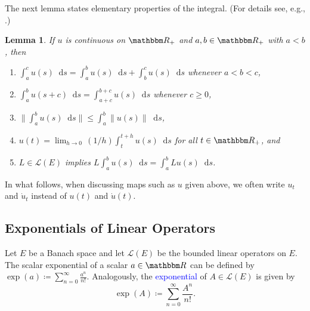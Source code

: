 \documentclass[12pt, reqno]{amsart}
\renewcommand{\leq}{\leqslant}
\renewcommand{\geq}{\geqslant}
\newcommand{\1}{\mathbbm 1}
\newcommand*\diff{\mathop{}\!\mathrm{d}}
\newcommand{\lL}{\mathcal L}
\newcommand{\RR}{\mathbbm R}
\theoremstyle{plain}
\newtheorem{lemma}[theorem]{Lemma}
\theoremstyle{definition}
\newcommand{\navy}[1]{\textcolor{blue}{#1}}
\begin{document}
The next lemma states elementary properties of the integral.
(For details see, e.g., \cite{applebaum2019semigroups}.)

\begin{lemma}\label{l:riemann}
    If $u$ is continuous on $\RR_+$ and $a, b \in \RR_+$ with $a < b$, then
    \begin{enumerate}
        \item $\int_a^c u(s) \diff s 
            = \int_a^b u(s) \diff s + \int_b^c u(s) \diff s$ whenever $a < b < c$,
        \item $\int_a^b u(s + c) \diff s = \int_{a+c}^{b+c} u(s)
            \diff s$ whenever $c \geq 0$,
        \item $\| \int_a^b u(s) \diff s \| \leq \int_a^b \|
            u(s)  \| \diff s$,
        \item $u(t) = \lim_{h \to 0} \, (1/h) \int_t^{t+h} u(s) \diff s$ for all
            $t \in \RR_+$, and
        \item $L \in \lL(E)$ implies $L \int_a^b u(s) \diff s = \int_a^b Lu(s) \diff s $.
    \end{enumerate}
\end{lemma}

In what follows, when discussing maps such as $u$ given above,
we often write $u_t$ and $\dot u_t$ instead of $u(t)$ and $\dot u(t)$.


\subsection{Exponentials of Linear Operators}

Let $E$ be a Banach space and let $\lL(E)$ be the bounded linear operators on $E$.
The scalar exponential of a scalar $a \in \RR$ can be defined by $\exp(a)
\coloneq \sum_{n=0}^\infty \frac{a^n}{n!}$.  Analogously, the \navy{exponential}
of $A \in \lL(E)$ is given by
%
\begin{equation}\label{eq:expfun} 
    \exp(A) \coloneq \sum_{n=0}^\infty \frac{A^n}{n!}.
\end{equation}
%
\end{document}
